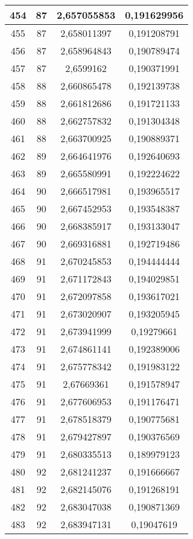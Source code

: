 {\begin{minipage}[!h]{0.45\textwidth}
\begin{longtable}{cccc}
454 & 87 & 2,657055853 & 0,191629956 \\ \hline
455 & 87 & 2,658011397 & 0,191208791 \\ \hline
456 & 87 & 2,658964843 & 0,190789474 \\ \hline
457 & 87 & 2,6599162 & 0,190371991 \\ \hline
458 & 88 & 2,660865478 & 0,192139738 \\ \hline
459 & 88 & 2,661812686 & 0,191721133 \\ \hline
460 & 88 & 2,662757832 & 0,191304348 \\ \hline
461 & 88 & 2,663700925 & 0,190889371 \\ \hline
462 & 89 & 2,664641976 & 0,192640693 \\ \hline
463 & 89 & 2,665580991 & 0,192224622 \\ \hline
464 & 90 & 2,666517981 & 0,193965517 \\ \hline
465 & 90 & 2,667452953 & 0,193548387 \\ \hline
466 & 90 & 2,668385917 & 0,193133047 \\ \hline
467 & 90 & 2,669316881 & 0,192719486 \\ \hline
468 & 91 & 2,670245853 & 0,194444444 \\ \hline
469 & 91 & 2,671172843 & 0,194029851 \\ \hline
470 & 91 & 2,672097858 & 0,193617021 \\ \hline
471 & 91 & 2,673020907 & 0,193205945 \\ \hline
472 & 91 & 2,673941999 & 0,19279661 \\ \hline
473 & 91 & 2,674861141 & 0,192389006 \\ \hline
474 & 91 & 2,675778342 & 0,191983122 \\ \hline
475 & 91 & 2,67669361 & 0,191578947 \\ \hline
476 & 91 & 2,677606953 & 0,191176471 \\ \hline
477 & 91 & 2,678518379 & 0,190775681 \\ \hline
478 & 91 & 2,679427897 & 0,190376569 \\ \hline
479 & 91 & 2,680335513 & 0,189979123 \\ \hline
480 & 92 & 2,681241237 & 0,191666667 \\ \hline
481 & 92 & 2,682145076 & 0,191268191 \\ \hline
482 & 92 & 2,683047038 & 0,190871369 \\ \hline
483 & 92 & 2,683947131 & 0,19047619 \\ \hline

\end{longtable}
\end{minipage}}
